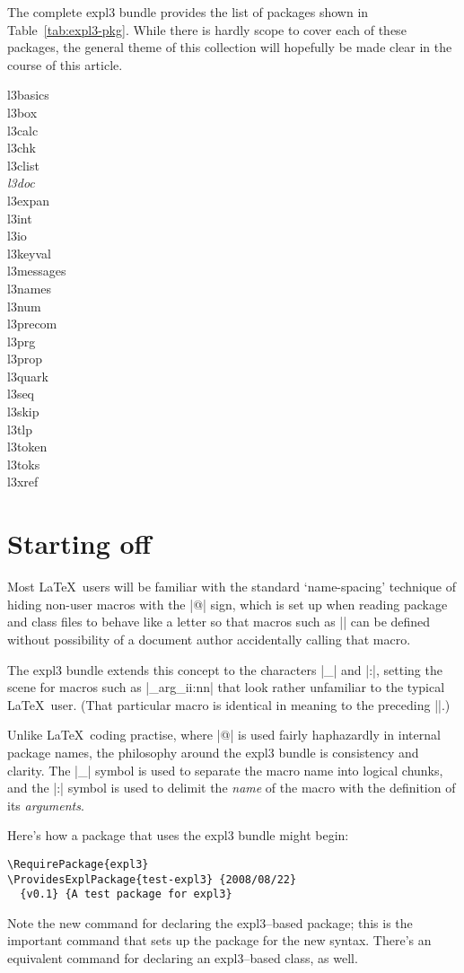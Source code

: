 \documentclass{ltugboat}
\def\pkg#1{\textsf{#1}}
\begin{document}
The complete \pkg{expl3} bundle provides the list of packages shown in
Table~\ref{tab:expl3-pkg}. While there is hardly scope to cover each of these
packages, the general theme of this collection will hopefully be made clear in
the course of this article.

\begin{table}
\caption{Packages provided by \pkg{expl3}; emphasised \emph{\pkg{l3doc}} is
the class used to document \pkg{expl3}-related packages.}
\label{tab:expl3-pkg}
\begin{multicols}{4}
\small\sffamily\centering
\begin{obeylines}
l3basics
l3box
l3calc
l3chk
l3clist
\emph{l3doc}
l3expan
l3int
l3io
l3keyval
l3messages
l3names
l3num
l3precom
l3prg
l3prop
l3quark
l3seq
l3skip
l3tlp
l3token
l3toks
l3xref
\end{obeylines}
\end{multicols}
\end{table}

\section{Starting off} 

Most \LaTeX\ users will be familiar with the standard `name-spacing' technique
of hiding non-user macros with the |@| sign, which is set up when reading
package and class files to behave like a letter so that macros such as
|\@secondoftwo| can be defined without possibility of a document author
accidentally calling that macro.

The \pkg{expl3} bundle extends this concept to the characters |_| and |:|,
setting the scene for macros such as |\use_arg_ii:nn| that look rather
unfamiliar to the typical \LaTeX\ user. (That particular macro is identical in
meaning to the preceding |\@secondoftwo|.)

Unlike \LaTeX\ coding practise, where |@| is used fairly haphazardly in
internal package names, the philosophy around the \pkg{expl3} bundle is
consistency and clarity. The |_| symbol is used to separate the macro name
into logical chunks, and the |:| symbol is used to delimit the \emph{name} of
the macro with the definition of its \emph{arguments}.

Here's how a package that uses the \pkg{expl3} bundle might begin:
\begin{lstlisting}
\RequirePackage{expl3}
\ProvidesExplPackage{test-expl3} {2008/08/22}
  {v0.1} {A test package for expl3}
\end{lstlisting}
Note the new command for declaring the \pkg{expl3}--based package; this is the
important command that sets up the package for the new syntax. There's an
equivalent command for declaring an \pkg{expl3}--based class, as well.
\end{document}
